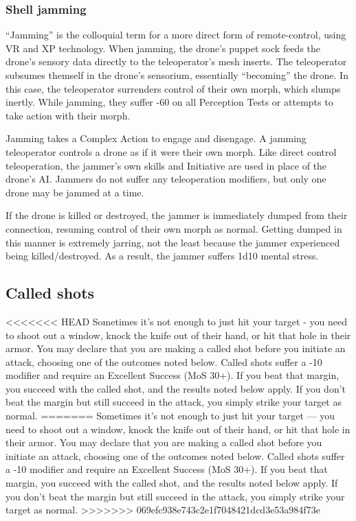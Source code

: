 \subsubsection{Shell jamming} 

``Jamming'' is the colloquial term for a more direct form of remote-control, using VR and XP technology. When jamming, the drone’s puppet sock feeds the drone’s sensory data directly to the teleoperator’s mesh inserts. The teleoperator subsumes themself in the drone’s sensorium, essentially ``becoming'' the drone. In this case, the teleoperator surrenders control of their own morph, which slumps inertly. While jamming, they suffer -60 on all Perception Tests or attempts to take action with their morph. 

Jamming takes a Complex Action to engage and disengage. A jamming teleoperator controls a drone as if it were their own morph. Like direct control teleoperation, the jammer’s own skills and Initiative are used in place of the drone’s AI. Jammers do not suffer any teleoperation modifiers, but only one drone may be jammed at a time. 

If the drone is killed or destroyed, the jammer is immediately dumped from their connection, resuming control of their own morph as normal. Getting dumped in this manner is extremely jarring, not the least because the jammer experienced being killed/destroyed. As a result, the jammer suffers 1d10 mental stress. 



\subsection{Called shots} \label{sec:called-shots} 

<<<<<<< HEAD Sometimes it’s not enough to just hit your target - you need to shoot out a window, knock the knife out of their hand, or hit that hole in their armor. You may declare that you are making a called shot before you initiate an attack, choosing one of the outcomes noted below. Called shots suffer a -10 modifier and require an Excellent Success (MoS 30+). If you beat that margin, you succeed with the called shot, and the results noted below apply. If you don’t beat the margin but still succeed in the attack, you simply strike your target as normal. ======= Sometimes it’s not enough to just hit your target --- you need to shoot out a window, knock the knife out of their hand, or hit that hole in their armor. You may declare that you are making a called shot before you initiate an attack, choosing one of the outcomes noted below. Called shots suffer a -10 modifier and require an Excellent Success (MoS 30+). If you beat that margin, you succeed with the called shot, and the results noted below apply. If you don’t beat the margin but still succeed in the attack, you simply strike your target as normal. >>>>>>> 069efc938e743c2e1f7048421dcd3e53a984f73e 


